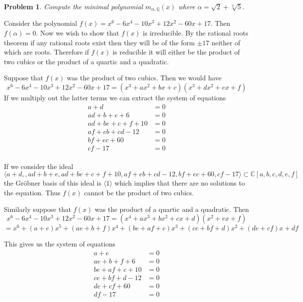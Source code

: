 \documentclass[10pt]{article}
\newcommand{\sk}{\vskip 10mm}
\newcommand{\bb}[1]{\mathbb{#1}}
\theoremstyle{plain}
\newtheorem{problem}{Problem}
\theoremstyle{remark}
\begin{document}
\sk

\begin{problem}
  Compute the minimal polynomial $m_{\alpha, \mathbb{Q}}(x)$
  where $\alpha = \sqrt{2} + \sqrt[3]{5}$.
\end{problem}

Consider the polynomial $f(x)=x^{6} - 6 x^{4} - 10 x^{3} + 12 x^{2} - 60 x + 17$. Then $f(\alpha)=0$.
Now we wish to show that $f(x)$ is irreducible. By the rational roots theorem
if any rational roots exist then they will be of the form $\pm 17$ neither of which are
roots. Therefore if $f(x)$ is reducible it will either be the product of two cubics or
the product of a quartic and a quadratic.

Suppose that $f(x)$ was the product of two cubics. Then we would have
\[ x^{6} - 6 x^{4} - 10 x^{3} + 12 x^{2} - 60 x + 17 = (x^3+ax^2+bx+c)(x^3+dx^2+ex+f) \]
If we multiply out the latter terms we can extract the system of equations
\begin{align*}
  a+d &=0\\
  ad+b+e +6 &= 0\\
  ad+be+c+f+10&= 0\\
  af+eb+cd-12&= 0\\
  bf+ec+60&= 0\\
  cf - 17 &= 0\\
\end{align*}

If we consider the ideal
\[\langle a+d,,ad+b+e,ad+be+c+f+10,af+eb+cd-12,bf+ec+60,cf-17\rangle\subset \bb{C}[a,b,c,d,e,f]\]
the Gr\"obner basis of this ideal is $\langle 1\rangle$ which implies that there are no solutions
to the equation. Thus $f(x)$ cannot be the product of two cubics.

Similarly suppose that $f(x)$ was the product of a quartic and a quadratic.
Then
\[ x^{6} - 6 x^{4} - 10 x^{3} + 12 x^{2} - 60 x + 17 = (x^4+ax^3+bx^2+cx+d)(x^2+ex+f)\]
  \[=x^{6} + \left(a + e\right) x^{5} + \left(a e + b + f\right) x^{4} + \left(b e + a f + c\right) x^{3} + \left(c e + b f + d\right) x^{2} + \left(d e + c f\right) x + d f \]

This gives us the system of equations
\begin{align*}
  a+e&= 0\\
  ae+b+f+6&= 0\\
  be+af+c+10&= 0\\
  ce+bf+d-12&= 0\\
  de+cf+60&= 0\\
  df -17&= 0\\
\end{align*}
\end{document}
